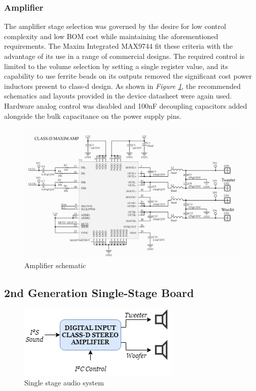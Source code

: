\documentclass[main.tex]{subfiles}
\begin{document}
\subsubsection{Amplifier}
The amplifier stage selection was governed by the desire for low control complexity and low BOM cost while maintaining the aforementioned requirements. The Maxim Integrated MAX9744 fit these criteria with the advantage of its use in a range of commercial designs. The required control is limited to the volume selection by setting a single register value, and its capability to use ferrite beads on its outputs removed the significant cost power inductors present to class-d design. As shown in \textit{Figure \ref{fig:maxim-circuit}}, the recommended schematics and layouts provided in the device datasheet were again used. Hardware analog control was disabled and 100nF decoupling capacitors added alongside the bulk capacitance on the power supply pins.

\begin{figure}[H]
    \centering
    \includegraphics[scale=0.6]{./figs/MAXIM-circuit.PNG}
    \caption{Amplifier schematic}
    \label{fig:maxim-circuit}
\end{figure}

\subsection{2nd Generation Single-Stage Board}

\begin{figure}[H]
    \centering
    \includegraphics[scale=0.75]{./figs/TAS-system.png}
    \caption{Single stage audio system}
    \label{fig:tas-system}
\end{figure}
\end{document}
